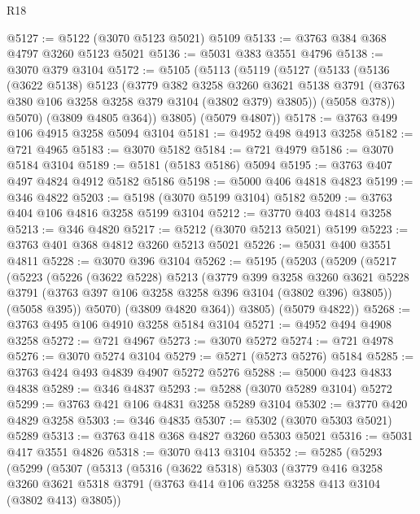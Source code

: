 \begin{lexlean}{R18}
\begin{coremodule}
@5127 := @5122 (@3070 @5123 @5021) @5109
@5133 := @3763 @384 @368 @4797 @3260 @5123 @5021
@5136 := @5031 @383 @3551 @4796
@5138 := @3070 @379 @3104
@5172 := @5105
    (@5113
      (@5119
        (@5127
          (@5133
            (@5136
              (@3622 @5138)
              @5123
              (@3779
                @382
                @3258
                @3260
                @3621
                @5138
                @3791
                (@3763 @380 @106 @3258 @3258 @379 @3104 (@3802 @379) @3805))
              (@5058 @378))
            @5070)
          (@3809 @4805 @364))
        @3805)
      (@5079 @4807))
@5178 := @3763 @499 @106 @4915 @3258 @5094 @3104
@5181 := @4952 @498 @4913 @3258
@5182 := @721 @4965
@5183 := @3070 @5182
@5184 := @721 @4979
@5186 := @3070 @5184 @3104
@5189 := @5181 (@5183 @5186) @5094
@5195 := @3763 @407 @497 @4824 @4912 @5182 @5186
@5198 := @5000 @406 @4818 @4823
@5199 := @346 @4822
@5203 := @5198 (@3070 @5199 @3104) @5182
@5209 := @3763 @404 @106 @4816 @3258 @5199 @3104
@5212 := @3770 @403 @4814 @3258
@5213 := @346 @4820
@5217 := @5212 (@3070 @5213 @5021) @5199
@5223 := @3763 @401 @368 @4812 @3260 @5213 @5021
@5226 := @5031 @400 @3551 @4811
@5228 := @3070 @396 @3104
@5262 := @5195
    (@5203
      (@5209
        (@5217
          (@5223
            (@5226
              (@3622 @5228)
              @5213
              (@3779
                @399
                @3258
                @3260
                @3621
                @5228
                @3791
                (@3763 @397 @106 @3258 @3258 @396 @3104 (@3802 @396) @3805))
              (@5058 @395))
            @5070)
          (@3809 @4820 @364))
        @3805)
      (@5079 @4822))
@5268 := @3763 @495 @106 @4910 @3258 @5184 @3104
@5271 := @4952 @494 @4908 @3258
@5272 := @721 @4967
@5273 := @3070 @5272
@5274 := @721 @4978
@5276 := @3070 @5274 @3104
@5279 := @5271 (@5273 @5276) @5184
@5285 := @3763 @424 @493 @4839 @4907 @5272 @5276
@5288 := @5000 @423 @4833 @4838
@5289 := @346 @4837
@5293 := @5288 (@3070 @5289 @3104) @5272
@5299 := @3763 @421 @106 @4831 @3258 @5289 @3104
@5302 := @3770 @420 @4829 @3258
@5303 := @346 @4835
@5307 := @5302 (@3070 @5303 @5021) @5289
@5313 := @3763 @418 @368 @4827 @3260 @5303 @5021
@5316 := @5031 @417 @3551 @4826
@5318 := @3070 @413 @3104
@5352 := @5285
    (@5293
      (@5299
        (@5307
          (@5313
            (@5316
              (@3622 @5318)
              @5303
              (@3779
                @416
                @3258
                @3260
                @3621
                @5318
                @3791
                (@3763 @414 @106 @3258 @3258 @413 @3104 (@3802 @413) @3805))

\end{coremodule}
\end{lexlean}
